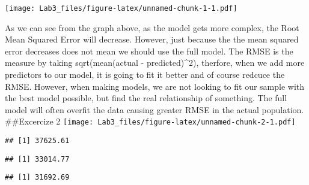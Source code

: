 \documentclass[
]{article}
\begin{document}
\texttt{[image: Lab3\_files/figure-latex/unnamed-chunk-1-1.pdf]}

As we can see from the graph above, as the model gets more complex, the
Root Mean Squared Error will decrease. However, just because the the
mean squared error decreases does not mean we should use the full model.
The RMSE is the measure by taking sqrt(mean(actual - predicted)\^{}2),
therfore, when we add more predictors to our model, it is going to fit
it better and of course redcuce the RMSE. However, when making models,
we are not looking to fit our sample with the best model possible, but
find the real relationship of something. The full model will often
overfit the data causing greater RMSE in the actual population.
\#\#Excercize 2
\texttt{[image: Lab3\_files/figure-latex/unnamed-chunk-2-1.pdf]}

\begin{verbatim}
## [1] 37625.61
\end{verbatim}

\begin{verbatim}
## [1] 33014.77
\end{verbatim}

\begin{verbatim}
## [1] 31692.69
\end{verbatim}
\end{document}
